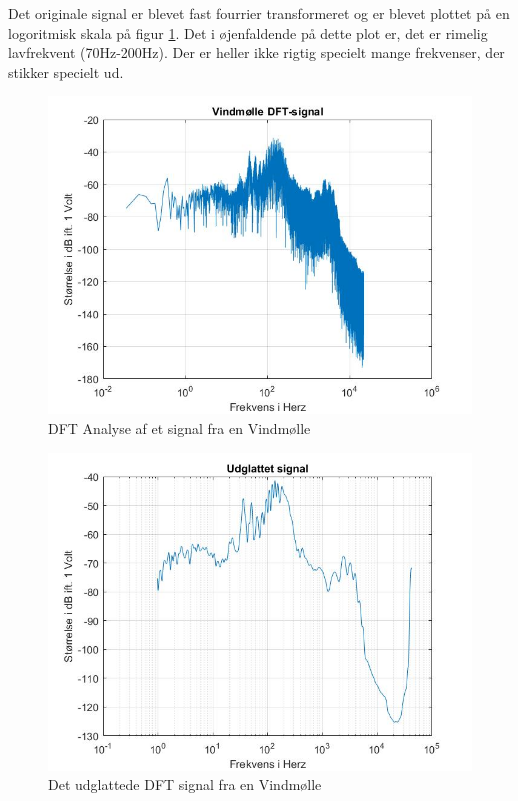 Det originale signal er blevet fast fourrier transformeret og er blevet plottet på en logoritmisk skala på figur \ref{fig:Vind DFT}. Det i øjenfaldende på dette plot er, det er rimelig lavfrekvent (70Hz-200Hz). Der er heller ikke rigtig specielt mange frekvenser, der stikker specielt ud.
\begin{figure}[H]
	\centering
	\includegraphics[width=140mm]{figures/Vind/DFT.jpg}
	\caption{DFT Analyse af et signal fra en Vindmølle}
	\label{fig:Vind DFT}
\end{figure}

\begin{figure}[H]
	\centering
	\includegraphics[width=140mm]{figures/Vind/udglattet.jpg}
	\caption{Det udglattede DFT signal fra en Vindmølle}
	\label{fig:Vind udglattet}
\end{figure}



